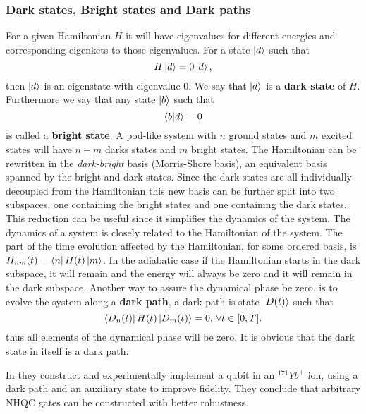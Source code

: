 \subsubsection{Dark states, Bright states and Dark paths}
For a given Hamiltonian $H$ it will have eigenvalues for different energies and corresponding eigenkets to those eigenvalues. For a state $\ket{d}$ such that 
\begin{equation}
H\ket{d} = 0\ket{d},
\end{equation}
then $\ket{d}$ is an eigenstate with eigenvalue $0$. We say that $\ket{d}$ is a \textbf{dark state} of $H$. Furthermore we say that any state $\ket{b}$ such that 
\begin{equation}
\bra{b}\ket{d} = 0
\end{equation}
is called a \textbf{bright state}. A pod-like system with $n$ ground states and $m$ excited states will have $n-m$ darks states and $m$ bright states\cite{lambda}.
The Hamiltonian can be rewritten in the \textit{dark-bright} basis (Morris-Shore basis), an equivalent basis spanned by the bright and dark states. Since the dark states are all individually decoupled from the Hamiltonian this new basis can be further split into two subspaces, one containing the bright states and one containing the dark states. This reduction can be useful since it simplifies the dynamics of the system. 
The dynamics of a system is closely related to the Hamiltonian of the system. The part of the time evolution affected by the Hamiltonian, for some ordered basis, is $H_{nm}(t) = \bra{n}H(t)\ket{m}$. In the adiabatic case if the Hamiltonian starts in the dark subspace, it will remain and the energy will always be zero and it will remain in the dark subspace. Another way to assure the dynamical phase be zero, is to evolve the system along a \textbf{dark path}, a dark path is state $\ket{D(t)}$ such that 
\begin{equation}
\bra{D_n(t)}H(t)\ket{D_m(t)} = 0, \, \forall t\in[0,T].
\end{equation}
thus all elements of the dynamical phase will be zero. It is obvious that the dark state in itself is a dark path.

In \cite{darkpath} they construct and experimentally implement a qubit in an $^{171}Yb^{+}$ ion, using a dark path and an auxiliary state to improve fidelity. They conclude that arbitrary NHQC gates can be constructed with better robustness. 
